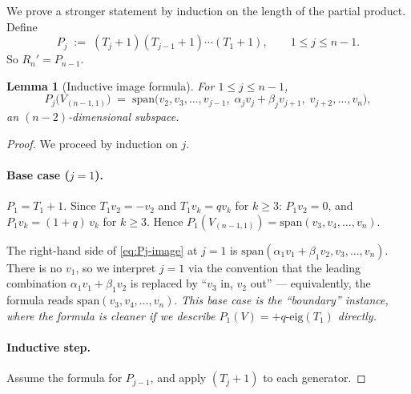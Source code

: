 \documentclass[11pt]{article}
\newtheorem{lemma}[theorem]{Lemma}
\theoremstyle{definition}
\begin{document}
We prove a stronger statement by induction on the length of the partial
product. Define
\[
   P_j \;:=\; (T_j{+}1)(T_{j-1}{+}1)\cdots(T_1{+}1),
   \qquad 1 \le j \le n-1.
\]
So $R_n' = P_{n-1}$.

\begin{lemma}[Inductive image formula]\label{lem:Pj-image}
For $1 \le j \le n-1$,
\begin{equation}\label{eq:Pj-image}
   P_j\bigl(V_{(n-1,1)}\bigr) \;=\;
   \mathrm{span}\bigl(v_2, v_3, \ldots, v_{j-1},\;
                      \alpha_j v_j + \beta_j v_{j+1},\;
                      v_{j+2}, \ldots, v_n\bigr),
\end{equation}
an $(n{-}2)$-dimensional subspace.
\end{lemma}

\begin{proof}
We proceed by induction on $j$.

\paragraph{Base case ($j = 1$).}
$P_1 = T_1 + 1$. Since $T_1 v_2 = -v_2$ and $T_1 v_k = q v_k$ for
$k \ge 3$:
$P_1 v_2 = 0$, and $P_1 v_k = (1{+}q)\, v_k$ for $k \ge 3$.
Hence $P_1(V_{(n-1,1)}) = \mathrm{span}(v_3, v_4, \ldots, v_n)$.

The right-hand side of \eqref{eq:Pj-image} at $j=1$ is
$\mathrm{span}(\alpha_1 v_1 + \beta_1 v_2, v_3, \ldots, v_n)$. There is
no $v_1$, so we interpret $j=1$ via the convention that the leading
combination $\alpha_1 v_1 + \beta_1 v_2$ is replaced by ``$v_3$ in,
$v_2$ out'' --- equivalently, the formula reads
$\mathrm{span}(v_3, v_4, \ldots, v_n)$. \emph{This base case is the
``boundary'' instance, where the formula is cleaner if we describe
$P_1(V) = +q\text{-eig}(T_1)$ directly.}

\paragraph{Inductive step.}
Assume the formula for $P_{j-1}$, and apply $(T_j + 1)$ to each generator.


\end{proof}
\end{document}
